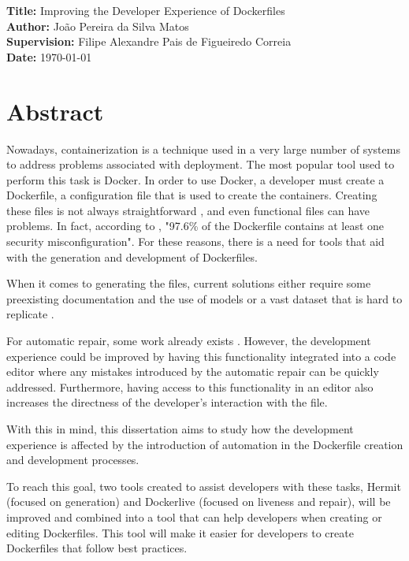 \documentclass[11pt,a4paper]{article}
\newcommand{\titles}[2]{\noindent\textbf{#1:} #2\\[2mm]}
\begin{document}
\titles{Title}{Improving the Developer Experience of Dockerfiles}
\titles{Author}{João Pereira da Silva Matos}
\titles{Supervision}{Filipe Alexandre Pais de Figueiredo Correia}
\titles{Date}{\today}

\section*{Abstract}

Nowadays, containerization is a technique used in a very large number of systems to address problems associated with deployment. The most popular tool used to perform this task is Docker. In order to use Docker, a developer must create a Dockerfile, a configuration file that is used to create the containers. Creating these files is not always straightforward \cite{reisLiveDockerContainers2020}, and even functional files can have problems. In fact, according to \citeauthor{prinettoSecurityMisconfigurationsDetection} \cite{prinettoSecurityMisconfigurationsDetection}, "97.6\% of the Dockerfile contains at least one security misconfiguration". For these reasons, there is a need for tools that aid with the generation and development of Dockerfiles.

When it comes to generating the files, current solutions either require some preexisting documentation and the use of models \cite{tomyModusDatalogDialect2022} or a vast dataset that is hard to replicate \cite{yeDockerGenKnowledgeGraph2021a}.

For automatic repair, some work already exists \cite{henkelShipwrightHumanintheLoopSystem2021}. However, the development experience could be improved by having this functionality integrated into a code editor where any mistakes introduced by the automatic repair can be quickly addressed. Furthermore, having access to this functionality in an editor also increases the directness \cite{maloneyDirectnessLivenessMorphic1995} of the developer's interaction with the file.

With this in mind, this dissertation aims to study how the development experience is affected by the introduction of automation in the Dockerfile creation and development processes.

To reach this goal, two tools created to assist developers with these tasks, Hermit \cite{maduroAutomaticServiceContainerization2021} (focused on generation) and Dockerlive \cite{reisLiveDockerContainers2020} (focused on liveness and repair), will be improved and combined into a tool that can help developers when creating or editing Dockerfiles. This tool will make it easier for developers to create Dockerfiles that follow best practices.
\end{document}
